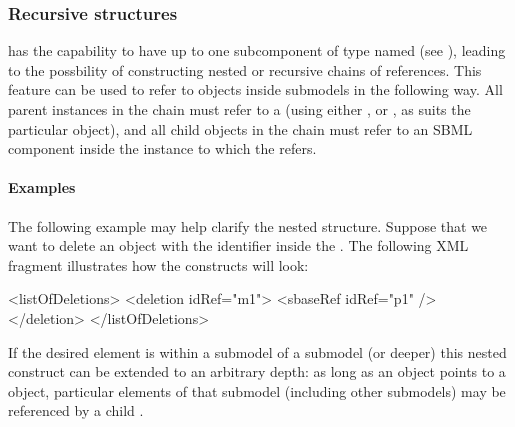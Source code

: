 \subsubsection{Recursive  structures}


\SBaseRef has the capability to have up to one subcomponent of type
\SBaseRef named  (see ), leading to
the possbility of constructing nested or recursive chains of references.
This feature can be used to refer to objects inside submodels in the
following way.  All parent \SBaseRef instances in the chain must refer to
a \Submodel (using either
,  or , as suits the
particular object), and all child \SBaseRef objects in the chain must refer to an SBML component inside the \Model
instance to which the \Submodel refers.


\paragraph{Examples}

The following example may help clarify the nested structure.  Suppose
that we want to delete an object with the identifier  inside the
\Submodel {}.  The following XML fragment illustrates how the
constructs will look:

\begin{example}
<listOfDeletions>
  <deletion idRef="m1">
    <sbaseRef idRef="p1" />
  </deletion>
</listOfDeletions>
\end{example}

If the desired element is within a submodel of a submodel (or deeper)
this nested construct can be extended to an arbitrary depth: as long as
an \SBaseRef object points to a \Submodel object, particular elements of
that submodel (including other submodels) may be referenced by a child
\SBaseRef.


